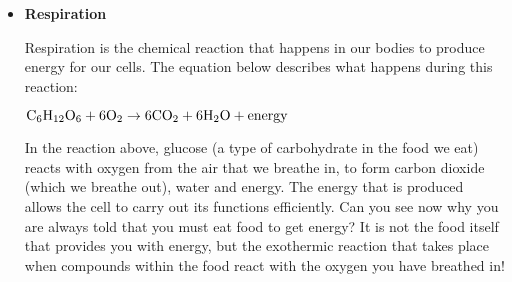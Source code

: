\begin{enumerate}
{\begin{itemize}
\begin{center}
$\rm{Fuel + Oxygen \rightarrow Heat + Water + Carbon ~Dioxide}$

$\rm{CH_{4} + 2O_{2} \rightarrow Heat + 2H_{2}O + CO_{2}}$
\end{center}

This is why we burn fuels for energy, because the chemical changes that take place during the reaction release huge amounts of energy, which we then use for things like power and electricity. You should also note that \textit{carbon dioxide} is produced during this reaction. Later we will discuss some of the negative impacts of $CO_{2}$ on the environment. The chemical reaction that takes place when fuels burn therefore has both positive and negative consequences.\\
\begin{IFact}{
Lightsticks or glowsticks are used by divers, campers, and for decoration and fun. A lightstick is a plastic tube with a glass vial inside it. To activate a lightstick, you bend the plastic stick, which breaks the glass vial. This allows the chemicals that are inside the glass to mix with the chemicals in the plastic tube. These two chemicals react and release energy. Another part of a lightstick is a fluorescent dye which changes this energy into light, causing the lightstick to glow!
}
\end{IFact}
\item{\textbf{Respiration}}

Respiration is the chemical reaction that happens in our bodies to produce energy for our cells. The equation below describes what happens during this reaction:

\begin{center}
$\rm{C_{6}H_{12}O_{6} + 6O_{2} \rightarrow 6CO_{2} + 6H_{2}O + energy}$
\end{center}

In the reaction above, glucose (a type of carbohydrate in the food we eat) reacts with oxygen from the air that we breathe in, to form carbon dioxide (which we breathe out), water and energy. The energy that is produced allows the cell to carry out its functions efficiently. Can you see now why you are always told that you must eat food to get energy? It is not the food itself that provides you with energy, but the exothermic reaction that takes place when compounds within the food react with the oxygen you have breathed in!
\end{itemize}
}
\end{enumerate}
\pagebreak
